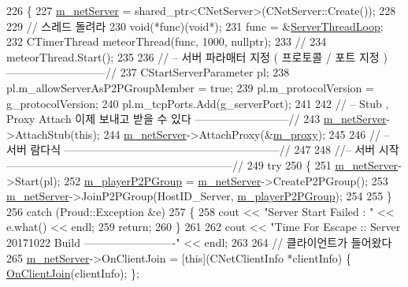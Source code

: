 \begin{DoxyCode}
226 \{
227     \hyperlink{class_server_acc5f0ab874532daace973f25df16888e}{m\_netServer} = shared\_ptr<CNetServer>(CNetServer::Create());
228 
229     \textcolor{comment}{// 스레드 돌려라}
230     void(*func)(\textcolor{keywordtype}{void}*);
231     func = &\hyperlink{_server_8cpp_aa49c05ac1cfbff49b47ca9ff62ae3761}{ServerThreadLoop};
232     CTimerThread meteorThread(func, 1000, \textcolor{keyword}{nullptr});
233     \textcolor{comment}{//}
234     meteorThread.Start();
235 
236     \textcolor{comment}{// -- 서버 파라매터 지정 ( 프로토콜 / 포트 지정 ) ---------------------------//}
237     CStartServerParameter pl;
238     pl.m\_allowServerAsP2PGroupMember = \textcolor{keyword}{true};
239     pl.m\_protocolVersion = g\_protocolVersion;
240     pl.m\_tcpPorts.Add(g\_serverPort);
241 
242     \textcolor{comment}{// -- Stub , Proxy Attach 이제 보내고 받을 수 있다 --------------------------//}
243     \hyperlink{class_server_acc5f0ab874532daace973f25df16888e}{m\_netServer}->AttachStub(\textcolor{keyword}{this});
244     \hyperlink{class_server_acc5f0ab874532daace973f25df16888e}{m\_netServer}->AttachProxy(&\hyperlink{class_server_adbe7ca5dd78f70ef2771eb1724b397de}{m\_proxy});
245 
246     \textcolor{comment}{// -- 서버 람다식 -----------------------------------------------------------//}
247 
248     \textcolor{comment}{//-- 서버 시작 --------------------------------------------------------------//}
249     \textcolor{keywordflow}{try}
250     \{
251         \hyperlink{class_server_acc5f0ab874532daace973f25df16888e}{m\_netServer}->Start(pl);
252         \hyperlink{class_server_a8f7f03253584e9db740a5f9f97ff1fc5}{m\_playerP2PGroup} = \hyperlink{class_server_acc5f0ab874532daace973f25df16888e}{m\_netServer}->CreateP2PGroup();
253         \hyperlink{class_server_acc5f0ab874532daace973f25df16888e}{m\_netServer}->JoinP2PGroup(HostID\_Server, \hyperlink{class_server_a8f7f03253584e9db740a5f9f97ff1fc5}{m\_playerP2PGroup});
254 
255     \}
256     \textcolor{keywordflow}{catch} (Proud::Exception &e)
257     \{
258         cout << \textcolor{stringliteral}{"Server Start Failed : "} << e.what() << endl;
259         \textcolor{keywordflow}{return};
260     \}
261 
262     cout << \textcolor{stringliteral}{"Time For Escape :: Server 20171022 Build -------------------------"} << endl;
263     
264     \textcolor{comment}{// 클라이언트가 들어왔다 }
265     \hyperlink{class_server_acc5f0ab874532daace973f25df16888e}{m\_netServer}->OnClientJoin = [\textcolor{keyword}{this}](CNetClientInfo *clientInfo) \{ 
      \hyperlink{class_server_af0a8684eda8d55b06a48a100320a2f3c}{OnClientJoin}(clientInfo); \};

\end{DoxyCode}
